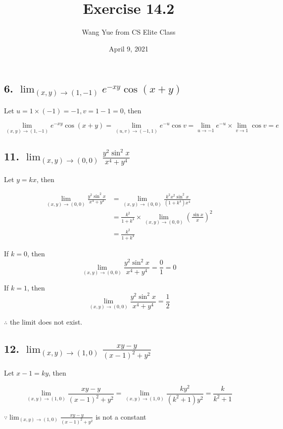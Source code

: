 \documentclass{article}
\begin{document}
    \title{Exercise 14.2}
    \author{Wang Yue from CS Elite Class}
    \date{April 9, 2021}
    \maketitle

    \subsection*{6. $\lim_{(x, y) \to (1, -1)} e^{-xy}\cos (x + y)$}

    Let $u = 1 \times (-1) = -1, v = 1 - 1 = 0$, then

    $$\lim_{(x, y) \to (1, -1)}e^{-xy}\cos (x + y) = \lim_{(u, v) \to (-1, 1)}e^{-u}\cos v = \lim_{u \to -1}e^{-u} \times \lim_{v \to 1} \cos v = e$$

    \subsection*{11. $\lim_{(x, y) \to (0, 0)} \frac{y^2 \sin^2 x}{x^4 + y^4}$}

    Let $y = kx$, then 
    
    $$\begin{aligned}
        \lim_{(x, y) \to (0, 0)} \frac{y^2\sin^2 x}{x^4 + y^4} &= \lim_{(x, y)\to(0, 0)} \frac{k^2x^2\sin^2 x}{(1+k^4)x^4} \\
        &= \frac{k^2}{1 + k^4} \times \lim_{(x, y) \to (0, 0)} (\frac{\sin x}{x})^2 \\
        &= \frac{k^2}{1 + k^4}
    \end{aligned}$$

    If $k = 0$, then $$\lim_{(x, y) \to (0, 0)} \frac{y^2\sin^2 x}{x^4 + y^4} = \frac 0 1 = 0$$

    If $k = 1$, then $$\lim_{(x, y) \to (0, 0)} \frac{y^2\sin^2 x}{x^4 + y^4} = \frac 1 2$$

    $\therefore$ the limit does not exist.

    \subsection*{12. $\lim_{(x, y) \to (1, 0)} \frac{xy-y}{(x-1)^2 + y^2}$}

    Let $x - 1= ky$, then 
    
    $$\lim_{(x, y) \to (1, 0)} \frac{xy-y}{(x-1)^2 + y^2} = \lim_{(x, y) \to (1, 0)} \frac{ky^2}{(k^2 + 1)y^2} = \frac{k}{k^2+1}$$

    $\because \lim_{(x, y) \to (1, 0)} \frac{xy-y}{(x-1)^2 + y^2}$ is not a constant
\end{document}
